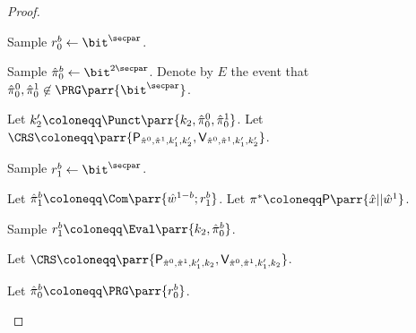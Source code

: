\begin{proof}
\begin{hybrids}
        \item Sample \(r_0^b \gets \bit^\secpar\).

        \item Sample \(\hat{\pi}_0^b \gets \bit^{2\secpar}\).
        Denote by \(E\) the event that \(\hat{\pi}_0^0, \hat{\pi}_0^1 \not\in \PRG\parr{\bit^\secpar}\).

        \item Let \(k'_2 \coloneqq \Punct\parr{k_2, \hat{\pi}_0^0, \hat{\pi}_0^1}\).
        Let \(\CRS \coloneqq \parr{\mathsf{P}_{\hat{\pi}^0,\hat{\pi}^1,k'_1,k'_2}, \mathsf{V}_{\hat{\pi}^0,\hat{\pi}^1,k'_1,k'_2}}\).

        \item Sample \(r_1^b \gets \bit^\secpar\).

        \item Let \(\hat{\pi}_1^b \coloneqq \Com\parr{\hat{w}^{1-b}; r_1^b}\).
        Let \(\pi^* \coloneqq \mathsf{P}\parr{\hat{x}||\hat{w}^1}\).

        \item Sample \(r_1^b \coloneqq \Eval\parr{k_2,\hat{\pi}_0^b}\).

        \item Let \(\CRS \coloneqq \parr{\mathsf{P}_{\hat{\pi}^0,\hat{\pi}^1,k'_1,k_2}, \mathsf{V}_{\hat{\pi}^0,\hat{\pi}^1,k'_1,k_2}}\).

        \item Let \(\hat{\pi}_0^b \coloneqq \PRG\parr{r_0^b}\).
        

\end{hybrids}
\end{proof}
